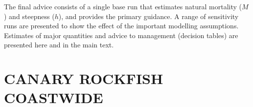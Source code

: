 \documentclass[11pt]{book}
\begin{document}
The final advice consists of a single base run that estimates natural mortality ($M$) and steepness ($h$), and provides the primary guidance.
A range of sensitivity runs are presented to show the effect of the important modelling assumptions.
Estimates of major quantities and advice to management (decision tables) are presented here and in the main text.



\renewcommand*{\arraystretch}{1.1}%

\newcommand{\nSims}{4,000}
\newcommand{\nChains}{8}
\newcommand{\cSims}{500}
\newcommand{\cBurn}{250}
\newcommand{\cSamps}{250}
\newcommand{\Nmcmc}{2,000}
\newcommand{\Nbase}{2,000}

\section{CANARY ROCKFISH COASTWIDE}



\renewcommand{\startYear}{1935} %
\renewcommand{\currYear}{2023}   %
\renewcommand{\prevYear}{2022}   %
\renewcommand{\projYear}{2033}   %
\renewcommand{\pgenYear}{2108}   %
\end{document}
